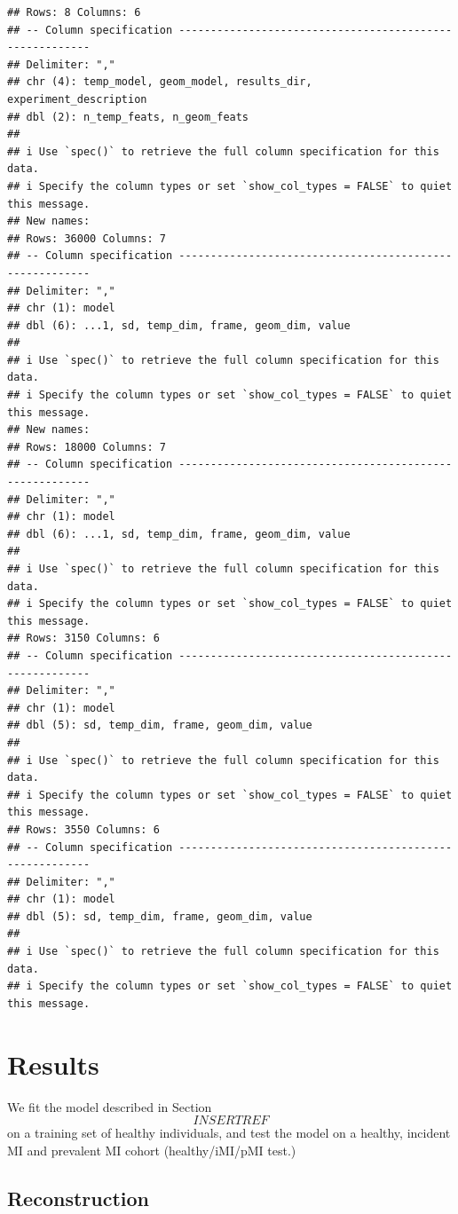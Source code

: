 \documentclass[
]{article}
\begin{document}
\begin{verbatim}
## Rows: 8 Columns: 6
## -- Column specification --------------------------------------------------------
## Delimiter: ","
## chr (4): temp_model, geom_model, results_dir, experiment_description
## dbl (2): n_temp_feats, n_geom_feats
## 
## i Use `spec()` to retrieve the full column specification for this data.
## i Specify the column types or set `show_col_types = FALSE` to quiet this message.
## New names:
## Rows: 36000 Columns: 7
## -- Column specification --------------------------------------------------------
## Delimiter: ","
## chr (1): model
## dbl (6): ...1, sd, temp_dim, frame, geom_dim, value
## 
## i Use `spec()` to retrieve the full column specification for this data.
## i Specify the column types or set `show_col_types = FALSE` to quiet this message.
## New names:
## Rows: 18000 Columns: 7
## -- Column specification --------------------------------------------------------
## Delimiter: ","
## chr (1): model
## dbl (6): ...1, sd, temp_dim, frame, geom_dim, value
## 
## i Use `spec()` to retrieve the full column specification for this data.
## i Specify the column types or set `show_col_types = FALSE` to quiet this message.
## Rows: 3150 Columns: 6
## -- Column specification --------------------------------------------------------
## Delimiter: ","
## chr (1): model
## dbl (5): sd, temp_dim, frame, geom_dim, value
## 
## i Use `spec()` to retrieve the full column specification for this data.
## i Specify the column types or set `show_col_types = FALSE` to quiet this message.
## Rows: 3550 Columns: 6
## -- Column specification --------------------------------------------------------
## Delimiter: ","
## chr (1): model
## dbl (5): sd, temp_dim, frame, geom_dim, value
## 
## i Use `spec()` to retrieve the full column specification for this data.
## i Specify the column types or set `show_col_types = FALSE` to quiet this message.
\end{verbatim}

\section{Results}\label{results}

We fit the model described in Section \[INSERT REF\] on a training set
of healthy individuals, and test the model on a healthy, incident MI and
prevalent MI cohort (healthy/iMI/pMI test.)

\subsection{Reconstruction}\label{reconstruction}
\end{document}
